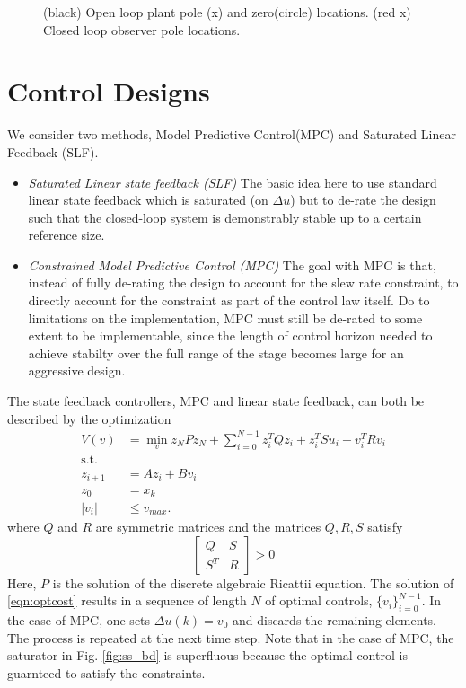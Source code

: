 \documentclass[journal,twocolumn,twoside]{IEEEtran}
\begin{document}
\begin{figure}
  
  \caption{(black) Open loop plant pole (x) and zero(circle) locations. (red x) Closed loop observer pole locations.}
  \label{fig:obs_cl}
\end{figure}


\section{Control Designs}
We consider two methods, Model Predictive Control(MPC) and Saturated Linear Feedback (SLF).
\begin{itemize}
\item\emph{Saturated Linear state feedback (SLF)} The basic idea here to use standard linear state feedback which is saturated (on $\Delta u$) but to de-rate the design such that the closed-loop system is demonstrably stable up to a certain reference size. 
\item\emph{Constrained Model Predictive Control (MPC)} The goal with MPC is that, instead of fully de-rating the design to account for the slew rate constraint, to directly account for the constraint as part of the control law itself. Do to limitations on the implementation, MPC must still be de-rated to some extent to be implementable, since the length of control horizon needed to achieve stabilty over the full range of the stage becomes large for an aggressive design.
\end{itemize}

The state feedback controllers, MPC and linear state feedback, can both be described by the optimization
\begin{align}
V(v) &= \min_{v} z_{N}Pz_{N} + \sum_{i=0}^{N-1}z_{i}^{T}Qz_{i} + z^T_iSu_i + v^{T}_{i}Rv_{i} \label{eqn:optcost}\\
 \text{s.t.} & \nonumber\\
z_{i+1} &= Az_{i} + Bv_{i}\\
z_{0} &= x_{k}\\
|v_i | & \leq v_{max}.\label{eqn:cntrl_constraint}
\end{align}
where $Q$ and $R$ are symmetric matrices and the matrices $Q,R,S$ satisfy
\begin{equation}
  \begin{bmatrix}
    Q & S\\S^T &R
  \end{bmatrix} > 0
\end{equation}
Here, $P$ is the solution of the discrete algebraic Ricattii equation. The solution of \eqref{eqn:optcost} results in a sequence of length $N$ of optimal controls, $\{v_i\}_{i=0}^{N-1}$. In the case of MPC, one sets $\Delta u(k) = v_0$ and discards the remaining elements. The process is repeated at the next time step. Note that in the case of MPC, the saturator in Fig. \ref{fig:ss_bd} is superfluous because the optimal control is guarnteed to satisfy the constraints.
\end{document}
